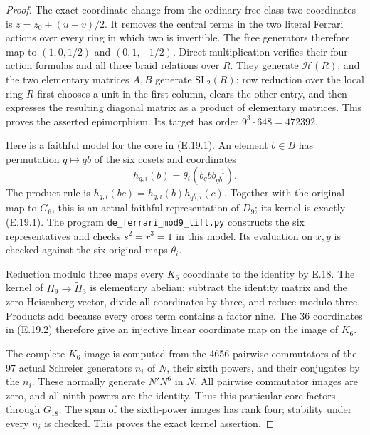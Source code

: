 \begin{proof}
The exact coordinate change from the ordinary free
class-two coordinates is
$z=z_0+(u-v)/2$. It removes the central terms in the
two literal Ferrari actions over every ring in which
two is invertible. The free generators therefore map
to $(1,0,1/2)$ and $(0,1,-1/2)$. Direct multiplication
verifies their four action formulas and all three
braid relations over $R$. They generate
$\mathcal H(R)$, and the two elementary matrices
$A,B$ generate $\mathrm{SL}_2(R)$: row reduction
over the local ring $R$ first chooses a unit in the
first column, clears the other entry, and then
expresses the resulting diagonal matrix as a product
of elementary matrices. This proves the asserted
epimorphism. Its target has order
$9^3\cdot648=472392$.

Here is a faithful model for the core in (E.19.1).
An element $b\in B$ has permutation
$q\mapsto q\bar b$ of the six cosets and coordinates
\[
 h_{q,i}(b)=\theta_i(b_q b b_{q\bar b}^{-1}).
 \tag{E.19.2}
\]
The product rule is
$h_{q,i}(bc)=h_{q,i}(b)h_{q\bar b,i}(c)$.
Together with the original map to $G_6$, this is an
actual faithful representation of $D_9$; its kernel
is exactly (E.19.1). The program
\texttt{de\_ferrari\_mod9\_lift.py} constructs the
six representatives and checks $s^2=r^3=1$ in this
model. Its evaluation on $x,y$ is checked against
the six original maps $\theta_i$.

Reduction modulo three maps every $K_6$ coordinate
to the identity by E.18. The kernel of
$H_9\to\widetilde H_3$ is elementary abelian:
subtract the identity matrix and the zero
Heisenberg vector, divide all coordinates by three,
and reduce modulo three. Products add because
every cross term contains a factor nine. The
36 coordinates in (E.19.2) therefore give an
injective linear coordinate map on the image
of $K_6$.

The complete $K_6$ image is computed from the
4656 pairwise commutators of the 97 actual
Schreier generators $n_i$ of $N$, their sixth
powers, and their conjugates by the $n_i$.
These normally generate $N'N^6$ in $N$.
All pairwise commutator images are zero, and
all ninth powers are the identity. Thus this
particular core factors through $G_{18}$.
The span of the sixth-power images has rank
four; stability under every $n_i$ is checked.
This proves the exact kernel assertion.


\end{proof}
